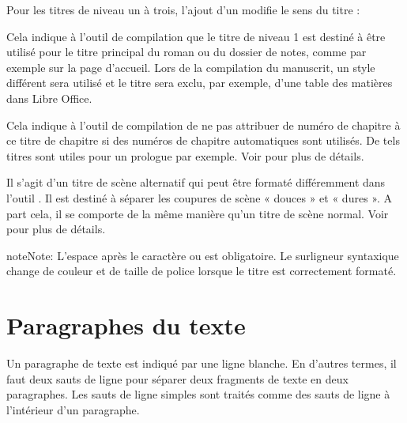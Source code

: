 \documentclass[a4paper,11pt,french]{sphinxmanual}
\begin{document}
\sphinxAtStartPar
Pour les titres de niveau un à trois, l’ajout d’un \sphinxcode{\sphinxupquote{!}} modifie le sens du titre :
\begin{description}
\sphinxAtStartPar
Cela indique à l’outil de compilation que le titre de niveau 1 est destiné à être utilisé pour le titre principal du roman ou du dossier de notes, comme par exemple sur la page d’accueil. Lors de la compilation du manuscrit, un style différent sera utilisé et le titre sera exclu, par exemple, d’une table des matières dans Libre Office.

\sphinxAtStartPar
Cela indique à l’outil de compilation de ne pas attribuer de numéro de chapitre à ce titre de chapitre si des numéros de chapitre automatiques sont utilisés. De tels titres sont utiles pour un prologue par exemple. Voir {\hyperref[\detokenize{project_structure:a-struct-heads-unnum}]{}} pour plus de détails.

\sphinxAtStartPar
Il s’agit d’un titre de scène alternatif qui peut être formaté différemment dans l’outil . Il est destiné à séparer les coupures de scène « douces » et « dures ». A part cela, il se comporte de la même manière qu’un titre de scène normal. Voir {\hyperref[\detokenize{project_structure:a-struct-heads-scenes}]{}} pour plus de détails.

\end{description}

\begin{sphinxadmonition}{note}{Note:}
\sphinxAtStartPar
L’espace après le caractère \sphinxcode{\sphinxupquote{\#}} ou \sphinxcode{\sphinxupquote{!}} est obligatoire. Le surligneur syntaxique change de couleur et de taille de police lorsque le titre est correctement formaté.
\end{sphinxadmonition}


\section{Paragraphes du texte}
\label{\detokenize{usage_format:text-paragraphs}}\label{\detokenize{usage_format:a-fmt-text}}
\sphinxAtStartPar
Un paragraphe de texte est indiqué par une ligne blanche. En d’autres termes, il faut deux sauts de ligne pour séparer deux fragments de texte en deux paragraphes. Les sauts de ligne simples sont traités comme des sauts de ligne à l’intérieur d’un paragraphe.
\end{document}
